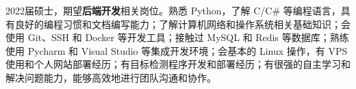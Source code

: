 {\onehalfspacing\hspace{2em}%
2022届硕士，期望\textbf{后端开发}相关岗位。熟悉 Python，了解 C/C\# 等编程语言，具有良好的编程习惯和文档编写能力；了解计算机网络和操作系统相关基础知识；会使用 Git、SSH 和 Docker 等开发工具；接触过 MySQL 和 Redis 等数据库；熟练使用 Pycharm 和 Visual Studio 等集成开发环境；会基本的 Linux 操作，有 VPS 使用和个人网站部署经历；有目标检测程序开发和部署经历；有很强的自主学习和解决问题能力，能够高效地进行团队沟通和协作。
\par}